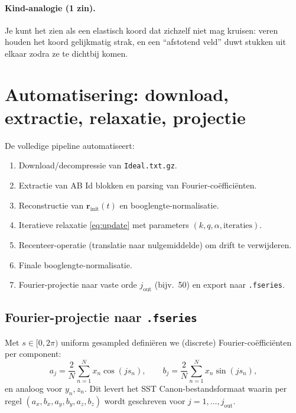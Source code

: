 \documentclass[11pt]{article}
\begin{document}
            \paragraph{Kind-analogie (1 zin).}
                Je kunt het zien als een elastisch koord dat zichzelf niet mag kruisen: veren houden het koord gelijkmatig strak, en een ``afstotend veld'' duwt stukken uit elkaar zodra ze te dichtbij komen. 🙂

        \section{Automatisering: download, extractie, relaxatie, projectie}
        De volledige pipeline automatiseert:
        \begin{enumerate}
            \item Download/decompressie van \texttt{Ideal.txt.gz}.
            \item Extractie van AB Id blokken en parsing van Fourier-co\"effici\"enten.
            \item Reconstructie van $\mathbf{r}_{\mathrm{init}}(t)$ en booglengte-normalisatie.
            \item Iteratieve relaxatie \eqref{eq:update} met parameters $(k,q,\alpha,\text{iteraties})$.
            \item Recenteer-operatie (translatie naar nulgemiddelde) om drift te verwijderen.
            \item Finale booglengte-normalisatie.
            \item Fourier-projectie naar vaste orde $j_{\mathrm{out}}$ (bijv.\ 50) en export naar \texttt{.fseries}.
        \end{enumerate}

        \subsection{Fourier-projectie naar \texttt{.fseries}}
            Met $s\in[0,2\pi)$ uniform gesampled defini\"eren we (discrete) Fourier-co\"effici\"enten per component:
            \begin{equation}
                a_j = \frac{2}{N}\sum_{n=1}^{N} x_n\cos(js_n),\qquad
                b_j = \frac{2}{N}\sum_{n=1}^{N} x_n\sin(js_n),
                \label{eq:fourier_proj}
            \end{equation}
            en analoog voor $y_n,z_n$. Dit levert het SST Canon-bestandsformaat waarin per regel $(a_x,b_x,a_y,b_y,a_z,b_z)$ wordt geschreven voor $j=1,\dots,j_{\mathrm{out}}$.
\end{document}
